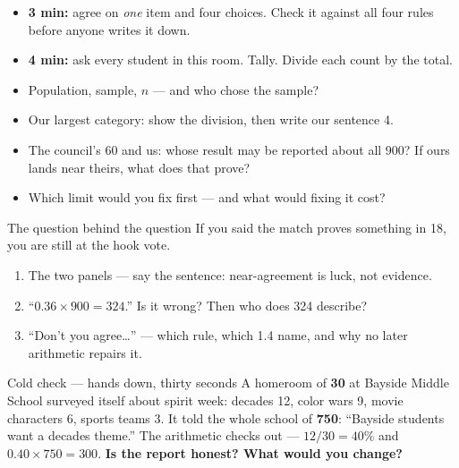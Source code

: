 \documentclass[aspectratio=169, 11pt]{beamer}
\begin{document}
\begin{frame}[t, plain]
  \vspace{2pt}
  \begin{itemize}\setlength{\itemsep}{4pt}
    \item[] \textbf{3 min:} agree on \emph{one} item and four choices. Check it against all four
            rules before anyone writes it down.
    \item[] \textbf{4 min:} ask every student in this room. Tally. Divide each count by the total.
    \item[16.] Population, sample, $n$ --- and who chose the sample?
    \item[17.] Our largest category: show the division, then write our sentence 4.
    \item[18.] The council's 60 and us: whose result may be reported about all 900? If ours lands
          near theirs, what does that prove?
    \item[19.] Which limit would you fix first --- and what would fixing it cost?
  \end{itemize}
  \begin{block}{The question behind the question}
    If you said the match proves something in 18, you are still at the hook vote.
  \end{block}
\end{frame}

\begin{frame}[t, plain]
  \vspace{2pt}
  \begin{enumerate}\setlength{\itemsep}{4pt}
    \item The two panels --- say the sentence: near-agreement is luck, not evidence.
    \item ``$0.36 \times 900 = 324$.'' Is it wrong? Then who does 324 describe?
    \item ``Don't you agree\ldots'' --- which rule, which 1.4 name, and why no later arithmetic
          repairs it.
  \end{enumerate}
  \vspace{4pt}
  \begin{block}{Cold check --- hands down, thirty seconds}
    A homeroom of \textbf{30} at Bayside Middle School surveyed itself about spirit week:
    decades 12, color wars 9, movie characters 6, sports teams 3. It told the whole school of
    \textbf{750}: ``Bayside students want a decades theme.'' The arithmetic checks out ---
    $12/30 = 40\%$ and $0.40 \times 750 = 300$. \textbf{Is the report honest? What would you
    change?}
  \end{block}
\end{frame}
\end{document}
